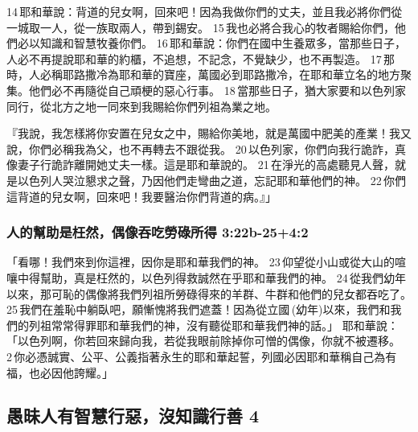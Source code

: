 14 耶和華說：背道的兒女啊，回來吧！因為我做你們的丈夫，並且我必將你們從一城取一人，從一族取兩人，帶到錫安。 15 我也必將合我心的牧者賜給你們，他們必以知識和智慧牧養你們。 16 耶和華說：你們在國中生養眾多，當那些日子，人必不再提說耶和華的約櫃，不追想，不記念，不覺缺少，也不再製造。 17 那時，人必稱耶路撒冷為耶和華的寶座，萬國必到耶路撒冷，在耶和華立名的地方聚集。他們必不再隨從自己頑梗的惡心行事。 18 當那些日子，猶大家要和以色列家同行，從北方之地一同來到我賜給你們列祖為業之地。


『我說，我怎樣將你安置在兒女之中，賜給你美地，就是萬國中肥美的產業！我又說，你們必稱我為父，也不再轉去不跟從我。 20 以色列家，你們向我行詭詐，真像妻子行詭詐離開她丈夫一樣。這是耶和華說的。 21 在淨光的高處聽見人聲，就是以色列人哭泣懇求之聲，乃因他們走彎曲之道，忘記耶和華他們的神。 22 你們這背道的兒女啊，回來吧！我要醫治你們背道的病。』」

\subsubsection{人的幫助是枉然，偶像吞吃勞碌所得 3:22b-25+4:2}
「看哪！我們來到你這裡，因你是耶和華我們的神。 23 仰望從小山或從大山的喧嚷中得幫助，真是枉然的，以色列得救誠然在乎耶和華我們的神。 24 從我們幼年以來，那可恥的偶像將我們列祖所勞碌得來的羊群、牛群和他們的兒女都吞吃了。 25 我們在羞恥中躺臥吧，願慚愧將我們遮蓋！因為從立國 (幼年)以來，我們和我們的列祖常常得罪耶和華我們的神，沒有聽從耶和華我們神的話。」
耶和華說：「以色列啊，你若回來歸向我，若從我眼前除掉你可憎的偶像，你就不被遷移。 2 你必憑誠實、公平、公義指著永生的耶和華起誓，列國必因耶和華稱自己為有福，也必因他誇耀。」


\subsection{愚昧人有智慧行惡，沒知識行善 4}

